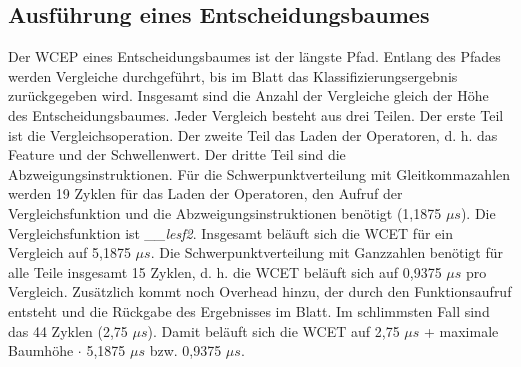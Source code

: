 \subsection{Ausführung eines Entscheidungsbaumes}
Der WCEP eines Entscheidungsbaumes ist der längste Pfad. Entlang des Pfades werden Vergleiche durchgeführt, bis im Blatt das Klassifizierungsergebnis zurückgegeben wird. Insgesamt sind die Anzahl der Vergleiche gleich
der Höhe des Entscheidungsbaumes.
\newline
\newline
Jeder Vergleich besteht aus drei Teilen. Der erste Teil ist die Vergleichsoperation. Der zweite Teil das Laden der Operatoren, d. h. das Feature und der Schwellenwert. Der dritte Teil sind die Abzweigungsinstruktionen. Für
die Schwerpunktverteilung mit Gleitkommazahlen werden 19 Zyklen für das Laden der Operatoren, den Aufruf der Vergleichsfunktion und die Abzweigungsinstruktionen benötigt (1,1875 $\mu s$). Die Vergleichsfunktion ist
\textit{\_\_lesf2}. Insgesamt beläuft sich die WCET für ein Vergleich auf 5,1875 $\mu s$. Die Schwerpunktverteilung mit Ganzzahlen benötigt für alle Teile insgesamt 15 Zyklen, d. h. die WCET beläuft sich
auf 0,9375 $\mu s$ pro Vergleich.
\newline
\newline
Zusätzlich kommt noch Overhead hinzu, der durch den Funktionsaufruf entsteht und die Rückgabe des Ergebnisses im Blatt. Im schlimmsten Fall sind das 44 Zyklen (2,75 $\mu s$). Damit beläuft sich die WCET auf
2,75 $\mu s$ + maximale Baumhöhe $\cdot$ 5,1875 $\mu s$ bzw. 0,9375 $\mu s$.